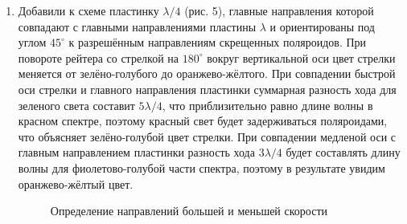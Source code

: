 \documentclass[a4paper,12pt]{article}
\begin{document}
\begin{enumerate}
		\item Добавили к схеме пластинку $\lambda/4$ (рис. 5), главные направления которой совпадают с главными направлениями пластины $\lambda$ и ориентированы под углом $45^\circ$ к разрешённым направлениям скрещенных поляроидов. При повороте рейтера со стрелкой на $180^\circ$ вокруг вертикальной оси цвет стрелки меняется от зелёно-голубого до оранжево-жёлтого. При совпадении быстрой оси стрелки и главного направления пластинки суммарная разность хода для зеленого света составит $5\lambda/4$, что приблизительно равно длине волны в красном спектре, поэтому красный свет будет задерживаться поляроидами, что объясняет зелёно-голубой цвет стрелки. При совпадении медленой оси с главным направлением пластинки разность хода $3\lambda /4$ будет составлять длину волны для фиолетово-голубой части спектра, поэтому в результате увидим оранжево-жёлтый цвет.
		\begin{figure}
		\centering
		    \caption{Определение направлений большей и меньшей скорости}
		\end{figure}
		
		\vspace{1cm}
	\end{enumerate}
\end{document}
